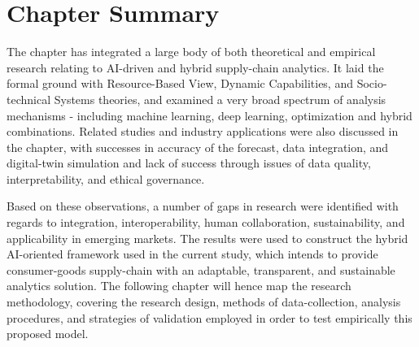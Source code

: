 \section{Chapter Summary}

The chapter has integrated a large body of both theoretical and empirical research relating to AI-driven and hybrid supply-chain analytics. It laid the formal ground with Resource-Based View, Dynamic Capabilities, and Socio-technical Systems theories, and examined a very broad spectrum of analysis mechanisms - including machine learning, deep learning, optimization and hybrid combinations. Related studies and industry applications were also discussed in the chapter, with successes in accuracy of the forecast, data integration, and digital-twin simulation and lack of success through issues of data quality, interpretability, and ethical governance.

Based on these observations, a number of gaps in research were identified with regards to integration, interoperability, human collaboration, sustainability, and applicability in emerging markets. The results were used to construct the hybrid AI-oriented framework used in the current study, which intends to provide consumer-goods supply-chain with an adaptable, transparent, and sustainable analytics solution. The following chapter will hence map the research methodology, covering the research design, methods of data-collection, analysis procedures, and strategies of validation employed in order to test empirically this proposed model.